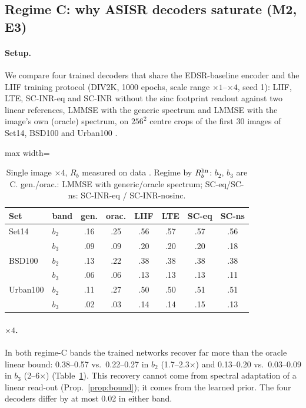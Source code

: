 \subsection{Regime C: why ASISR decoders saturate (M2, E3)}\label{sec:exp-c}

\paragraph{Setup.} We compare four trained decoders that share the
EDSR-baseline encoder and the LIIF training protocol (DIV2K, 1000 epochs,
scale range $\times1$--$\times4$, seed 1): LIIF, LTE, SC-INR-eq and
SC-INR without the sinc footprint readout 
against two linear references, LMMSE with the generic spectrum and LMMSE with
the image's own (oracle) spectrum, on $256^2$ centre crops of the first 30
images of Set14, BSD100 and Urban100 .

\begin{table}[t]\centering\small
\caption{Single image $\times4$, $R_b$ measured on data
. Regime by $R_b^{\mathrm{lin}}$: $b_2$, $b_3$ are C. gen./orac.: LMMSE with generic/oracle spectrum; SC-eq/SC-ns: SC-INR-eq / SC-INR-nosinc.}
\label{tab:h6c}
\setlength{\tabcolsep}{3pt}
\begin{adjustbox}{max width=\linewidth}\begin{tabular}{llcccccc}\toprule
Set & band & gen. & orac. & LIIF & LTE & SC-eq & SC-ns\\\midrule
Set14 & $b_2$ & .16 & .25 & .56 & .57 & .57 & .56\\
 & $b_3$ & .09 & .09 & .20 & .20 & .20 & .18\\
BSD100 & $b_2$ & .13 & .22 & .38 & .38 & .38 & .38\\
 & $b_3$ & .06 & .06 & .13 & .13 & .13 & .11\\
Urban100 & $b_2$ & .11 & .27 & .50 & .50 & .51 & .51\\
 & $b_3$ & .02 & .03 & .14 & .14 & .15 & .13\\
\bottomrule\end{tabular}\end{adjustbox}
\end{table}

\paragraph{$\times4$.} In both regime-C bands the trained networks recover
far more than the oracle linear bound: 0.38--0.57 vs.\ 0.22--0.27 in $b_2$
(1.7--2.3$\times$) and 0.13--0.20 vs.\ 0.03--0.09 in $b_3$ (2--6$\times$)
(Table~\ref{tab:h6c}). This recovery cannot come from spectral adaptation of a
linear read-out (Prop.~\ref{prop:bound}); it comes from the learned prior.
The four decoders differ by at most 0.02 in either band.

